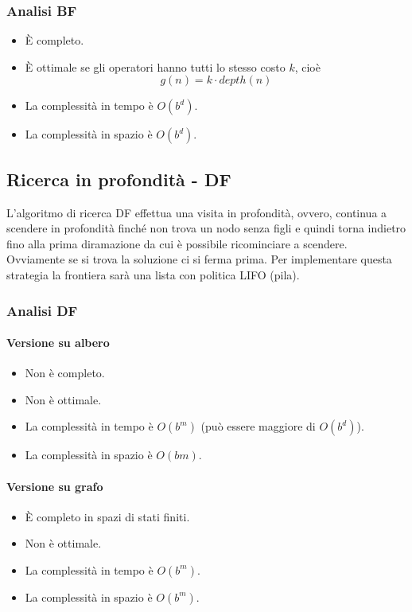 \subsubsection{Analisi BF}
\begin{itemize}
	\item \`E completo.
	\item \`E ottimale se gli operatori hanno tutti lo stesso costo $k$, cio\`e
	      \[ g(n) = k \cdot depth(n) \]
	\item La complessit\`a in tempo \`e $O(b^d)$.
	\item La complessit\`a in spazio \`e $O(b^d)$.
\end{itemize}

\subsection{Ricerca in profondit\`a - DF}
L'algoritmo di ricerca DF effettua una visita in profondit\`a, ovvero, continua a scendere
in profondit\`a finch\'e non trova un nodo senza figli e quindi torna indietro fino alla
prima diramazione da cui \`e possibile ricominciare a scendere. Ovviamente se si trova la
soluzione ci si ferma prima. Per implementare questa strategia la frontiera sar\`a una
lista con politica LIFO (pila).

\subsubsection{Analisi DF}
\paragraph{Versione su albero}
\begin{itemize}
	\item Non \`e completo.
	\item Non \`e ottimale.
	\item La complessit\`a in tempo \`e $O(b^m)$ (pu\`o essere maggiore di $O(b^d)$).
	\item La complessit\`a in spazio \`e $O(bm)$.
\end{itemize}
\paragraph{Versione su grafo}
\begin{itemize}
	\item \`E completo in spazi di stati finiti.
	\item Non \`e ottimale.
	\item La complessit\`a in tempo \`e $O(b^m)$.
	\item La complessit\`a in spazio \`e $O(b^m)$.
\end{itemize}

